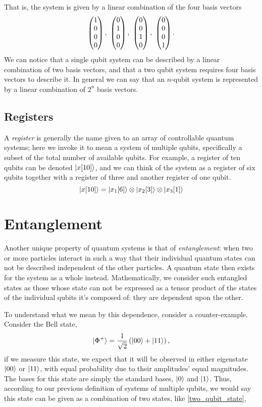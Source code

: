That is, the system is given by a linear combination of the four basis vectors
\begin{equation}
    \icol{1\\0\\0\\0}, \ \icol{0\\1\\0\\0}, \ \icol{0\\0\\1\\0}, \  \icol{0\\0\\0\\1}.
\end{equation}
We can notice that a single qubit system can be described by a linear combination of two basis vectors, 
    and that a two qubit system requires four basis vectors to describe it. 
In general we can say that an $n$-qubit system is represented by a linear combination of $2^n$ basis vectors. 

\subsection{Registers}
A \textit{register} is generally the name given to an array of controllable quantum systems; here we invoke it to mean a system of multiple qubits, specifically a subset of the total number of available qubits. 
For example, a register of ten qubits can be denoted $\ket{x[10]}$, and we can think of the system as a register of six qubits together with a register of three and another register of one qubit. 
$$ \ket{x[10]} = \ket{x_1[6]} \otimes \ket{x_2[3]} \otimes \ket{x_3[1]} $$


\section{Entanglement}
Another unique property of quantum systems is that of \emph{entanglement}: 
    when two or more particles interact in such a way that their individual quantum states can not be described independent of the other particles. 
A quantum state then exists for the system as a whole instead. 
Mathematically, we consider such entangled states as those whose state can not be expressed as a tensor product of the states of the individual qubits it's composed of: they are dependent upon the other. 
\par
To understand what we mean by this dependence, consider a counter-example. 
Consider the Bell state,
\begin{equation}
    \ket{\Phi^{+}} = \frac{1}{\sqrt{2}} \left( \ket{00} + \ket{11} \right),
\end{equation}
if we measure this state, we expect that it will be observed in either eigenstate $\ket{00} $ or $ \ket{11}$, 
    with equal probability due to their amplitudes' equal magnitudes. 
The bases for this state are simply the standard bases, $\ket{0}$ and $\ket{1}$. 
Thus, according to our previous definition of systems of multiple qubits, we would say this state can be given as a combination of two states, like \cref{two_qubit_state}, 

